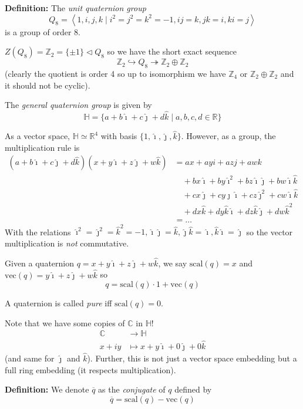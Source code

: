 \documentclass[12pt]{article}
\renewcommand{\hat}[1]{\widehat{#1}}
\newcommand{\R}{\mathbb{R}}
\newcommand{\Z}{\mathbb{Z}}
\newcommand{\C}{\mathbb{C}}
\renewcommand{\H}{\mathbb{H}}
\newcommand{\brak}[1]{\left\langle #1 \right\rangle}
\newcommand{\ihat}{\hat{\imath}}
\newcommand{\jhat}{\hat{\jmath}}
\newcommand{\khat}{\hat{k}}
\renewcommand{\bar}{\overline}
\begin{document}
    \textbf{Definition:} The \emph{unit quaternion group }
    \[Q_8 = \brak{1, i, j, k \;\big\vert\; i^2 = j^2 = k^2 = -1, ij = k, jk = i, ki = j}\]
    is a group of order 8. 

    $Z(Q_8) = \Z_2 = \{\pm 1\} \triangleleft Q_8$ so we have the short exact sequence 
    \[\Z_2 \hookrightarrow Q_8 \twoheadrightarrow \Z_2 \oplus \Z_2\] 
    (clearly the quotient is order 4 so up to isomorphism we have $\Z_4$ or $\Z_2 \oplus \Z_2$ and it should not be cyclic). 

    The \emph{general quaternion group} is given by 
    \[\H = \{a + b\ihat + c\jhat + d\khat \; | \; a, b, c, d \in \R\}\]

    As a vector space, $\H \simeq \R^4$ with basis $\{1, \ihat, \jhat, \khat\}$. However, as a group, the multiplication rule is 
    \begin{align*}
        (a + b\ihat + c\jhat + d\khat)(x + y\ihat + z\jhat + w\khat) &= ax + ayi + azj + awk\\ 
        &\quad + bx\ihat + by\ihat^2 + bz\ihat\jhat + bw\ihat\khat\\
        &\quad + cx\jhat + cy\jhat\ihat + cz\jhat^2 + cw\ihat\khat\\
        &\quad + dx\khat + dy\khat\ihat + dz\khat\jhat + dw\khat^2\\
        &= \dots
    \end{align*}
    With the relations $\ihat^2 = \jhat^2 = \khat^2 = -1, \ihat\jhat = \khat, \jhat\khat = \ihat, \khat\ihat = \jhat$ so the vector multiplication is \emph{not} commutative. 

    Given a quaternion $q = x + y\ihat + z\jhat + w\khat$, we say $\text{scal}(q) = x$ and $\text{vec}(q) = y\ihat + z\jhat + w\khat$ so 
    \[q = \text{scal}(q) \cdot 1 + \text{vec}(q)\] 
    
    A quaternion is called \emph{pure} iff $\text{scal}(q) = 0$. 

    Note that we have some copies of $\C$ in $\H$! 
    \begin{align*}
        \C &\to \H\\ 
        x + iy &\mapsto x + y\ihat + 0\jhat + 0\khat
    \end{align*}
    (and same for $\jhat$ and $\khat$). Further, this is not just a vector space embedding but a full ring embedding (it respects multiplication).

    \textbf{Definition:} We denote $\bar q$ as the \emph{conjugate} of $q$ defined by  
    \[\bar q = \text{scal}(q) - \text{vec}(q)\]
\end{document}

